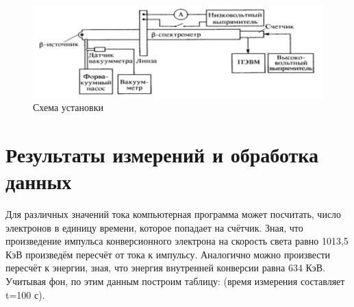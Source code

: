 \documentclass[12pt,a4paper]{article}
\begin{document}
\begin{figure}[h]
\includegraphics[scale = 0.7]{5.4.2-3}
\centering
\caption{Схема установки}
\end{figure}

\section{Результаты измерений и обработка данных}

     Для различных значений тока компьютерная программа может посчитать, число электронов в единицу времени, которое попадает на счётчик. Зная, что произведение импульса конверсионного электрона на скорость света равно 1013,5 КэВ произведём пересчёт от тока к импульсу. Аналогично можно произвести пересчёт к энергии, зная, что энергия внутренней конверсии равна 634 КэВ. Учитывая фон, по этим данным построим таблицу: (время измерения составляет t=100 с).
     
\end{document}
